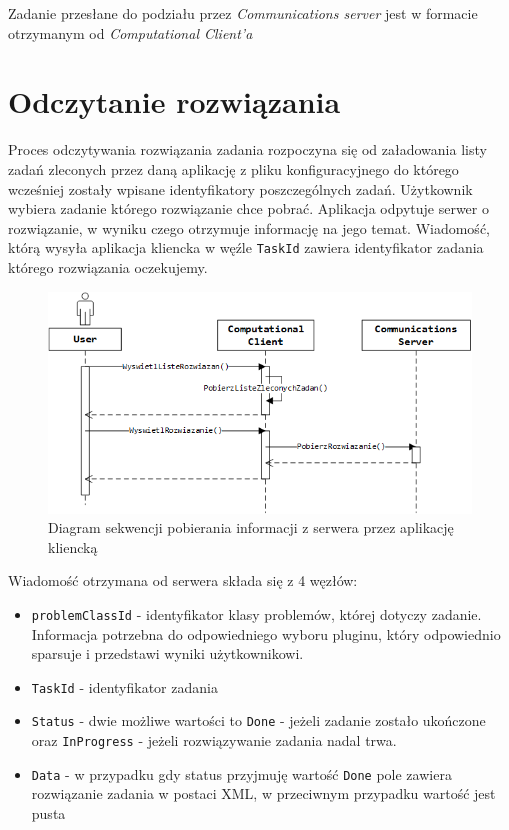 \documentclass[12pt,a4paper,titlepage]{report}
\begin{document}
	Zadanie przesłane do podziału przez \textit{Communications server} jest w formacie otrzymanym od \textit{Computational Client'a}    
    
    \section{Odczytanie rozwiązania}	
	Proces odczytywania rozwiązania zadania rozpoczyna się od załadowania listy zadań zleconych przez daną aplikację z pliku konfiguracyjnego do którego wcześniej zostały wpisane identyfikatory poszczególnych zadań. Użytkownik wybiera zadanie którego rozwiązanie
	chce pobrać. Aplikacja odpytuje serwer o rozwiązanie, w wyniku czego otrzymuje informację na jego temat. Wiadomość, którą wysyła aplikacja kliencka w węźle \verb+TaskId+ zawiera identyfikator zadania którego rozwiązania oczekujemy.\\

	 

	\begin{figure}[h]
		\centering
		\caption{Diagram sekwencji pobierania informacji z serwera przez aplikację kliencką}
		 \includegraphics[width=\textwidth]{img/communication/getresult.png}
	\end{figure} 	
	
	Wiadomość otrzymana od serwera składa się z 4 węzłów:
	\begin{itemize}
		\item \verb+problemClassId+ - identyfikator klasy problemów, której dotyczy zadanie. Informacja potrzebna do odpowiedniego wyboru 
		pluginu, który odpowiednio sparsuje i przedstawi wyniki użytkownikowi.
		\item \verb+TaskId+ - identyfikator zadania
		\item \verb+Status+ - dwie możliwe wartości to \verb+Done+ - jeżeli zadanie zostało ukończone oraz \verb+InProgress+ - jeżeli rozwiązywanie zadania nadal trwa.
		\item \verb+Data+ - w przypadku gdy status przyjmuję wartość \verb+Done+ pole zawiera rozwiązanie zadania w postaci XML,
		w przeciwnym przypadku wartość jest pusta
	\end{itemize}
	
\end{document}

